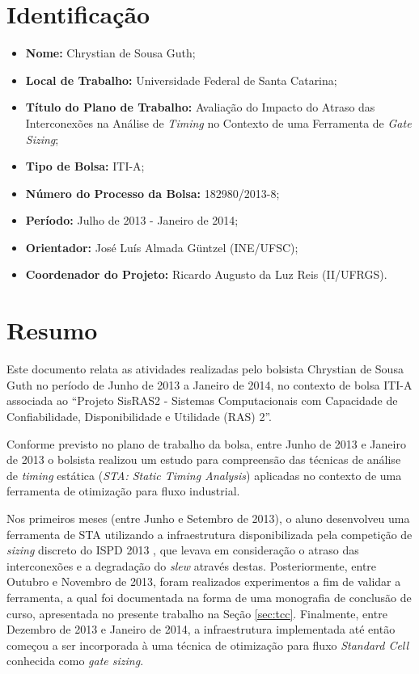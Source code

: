 \documentclass[
	12pt,				%
	openright,			%
	twoside,			%
	a4paper,			%
	english,			%
	french,				%
	spanish,			%
	brazil,				%
	]{abntex2}
\begin{document}
\section{Identificação}

\begin{itemize}
	\item \textbf{Nome:} Chrystian de Sousa Guth;
	\item \textbf{Local de Trabalho:} Universidade Federal de Santa Catarina;
	\item \textbf{Título do Plano de Trabalho:} Avaliação do Impacto do Atraso das Interconexões na Análise de \textit{Timing} no Contexto de uma Ferramenta de \textit{Gate Sizing};
	\item \textbf{Tipo de Bolsa:} ITI-A;
	\item \textbf{Número do Processo da Bolsa:} 182980/2013-8;
	\item \textbf{Período:} Julho de 2013 - Janeiro de 2014;
	\item \textbf{Orientador:} José Luís Almada Güntzel (INE/UFSC);
	\item \textbf{Coordenador do Projeto:} Ricardo Augusto da Luz Reis (II/UFRGS).
\end{itemize}

\section{Resumo}
Este documento relata as atividades realizadas pelo bolsista Chrystian de Sousa Guth no período de Junho de 2013 a Janeiro de 2014, no contexto de bolsa ITI-A associada ao ``Projeto SisRAS2 - Sistemas Computacionais com Capacidade de Confiabilidade, Disponibilidade e Utilidade (RAS) 2''.

Conforme previsto no plano de trabalho da bolsa, entre Junho de 2013 e Janeiro de 2013 o bolsista realizou um estudo para compreensão das técnicas de análise de \textit{timing} estática (\textit{STA: Static Timing Analysis}) aplicadas no contexto de uma ferramenta de otimização para fluxo industrial.

Nos primeiros meses (entre Junho e Setembro de 2013), o aluno desenvolveu uma ferramenta de STA utilizando a infraestrutura disponibilizada pela competição de \textit{sizing} discreto do ISPD 2013 \cite{Contest2013}, que levava em consideração o atraso das interconexões e a degradação do \textit{slew} através destas. Posteriormente, entre Outubro e Novembro de 2013, foram realizados experimentos a fim de validar a ferramenta, a qual foi documentada na forma de uma monografia de conclusão de curso, apresentada no presente trabalho na Seção \ref{sec:tcc}. Finalmente, entre Dezembro de 2013 e Janeiro de 2014, a infraestrutura implementada até então começou a ser incorporada à uma técnica de otimização para fluxo \textit{Standard Cell} conhecida como \textit{gate sizing}.
\end{document}
